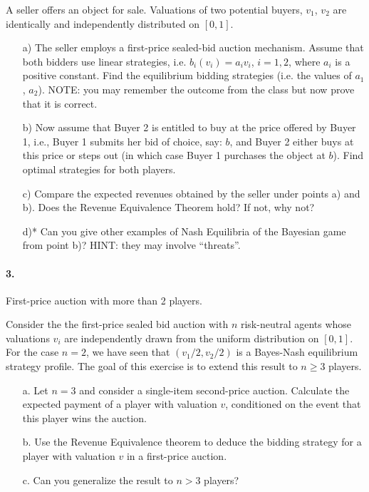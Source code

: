 \documentclass[a4paper,notitlepage,12pt]{article}
\begin{document}
 A seller offers an object for sale. Valuations of two potential buyers, $v_1$, $v_2$ are identically and independently distributed on $[0,1]$.
\begin{enumerate}
\item[a)]
 The seller employs a first-price sealed-bid auction mechanism. Assume that both bidders use linear strategies, i.e. $b_i(v_i) = a_iv_i$, $i = 1, 2$, where $a_i$ is a positive constant. Find the equilibrium bidding strategies (i.e. the values of $a_1$, $a_2$). NOTE: you may remember the outcome from the class but now prove that it is correct.
\item[b)] Now assume that Buyer 2 is entitled to buy at the price offered by Buyer 1, i.e., Buyer 1 submits her bid of choice, say: $b$, and Buyer 2 either buys at this price or steps out (in which case Buyer 1 purchases the object at $b$). Find optimal strategies for both players.
\item[c)]  Compare the expected revenues obtained by the seller under points a) and b). Does the Revenue Equivalence Theorem hold? If not, why not?

\item[d)*] Can you give other examples of Nash Equilibria of the Bayesian game from point b)? HINT: they may involve ``threats''.
\end{enumerate}

\paragraph{3. } First-price auction with more than 2 players.

Consider the the first-price sealed bid auction with $n$ risk-neutral agents whose valuations $v_i$ are independently drawn from the uniform distribution on $[0,1]$. For the case $n=2$, we have seen that $(v_1/2,v_2/2)$ is a Bayes-Nash equilibrium strategy profile. The goal of this exercise is to extend this result to $n \geq 3$ players.
\begin{enumerate}
  \item[a.] Let $n=3$ and consider a single-item second-price auction. Calculate the expected payment of a player with valuation $v$, conditioned on the event that this player wins the auction.
  \item[b.] Use the Revenue Equivalence theorem to deduce the bidding strategy for a player with valuation $v$ in a first-price auction.
  \item[c.] Can you generalize the result to $n > 3$ players?
\end{enumerate}
\end{document}
